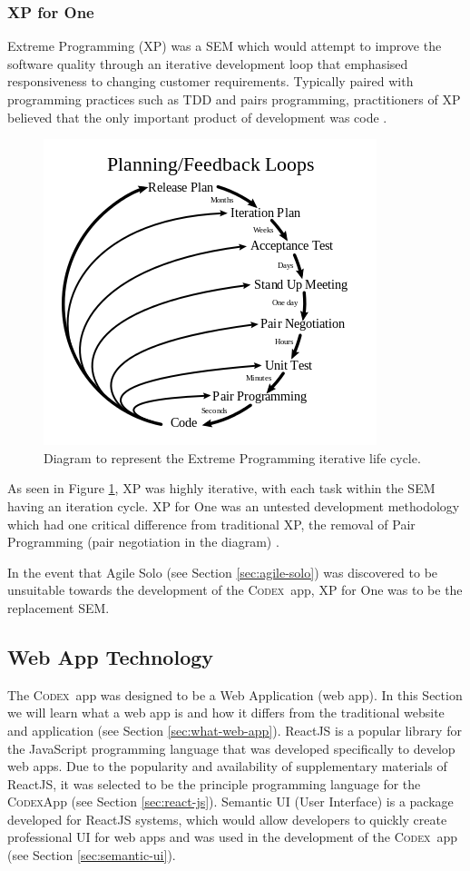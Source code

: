 \documentclass[final]{cmpreport}
\newcommand{\Codex}{\textsc{Codex}}
\begin{document}
			\subsubsection{XP for One} \label{sec:xp-for-one}
			Extreme Programming (XP) was a SEM which would attempt to improve the software quality through an iterative development loop that emphasised responsiveness to changing customer requirements. Typically paired with programming practices such as TDD and pairs programming, practitioners of XP believed that the only important product of development was code \citep{XP}.  
			
			\begin{figure}[H]
				\centering
				\includegraphics[width=0.6\linewidth]{xp.png}
				\caption[Extreme Programming Diagram]{Diagram to represent the Extreme Programming iterative life cycle.} \label{fig:xp}
			\end{figure}
			
			As seen in Figure \ref{fig:xp}, XP was highly iterative, with each task within the SEM having an iteration cycle. XP for One was an untested development methodology which had one critical difference from traditional XP, the removal of Pair Programming (pair negotiation in the diagram) \citep{SoloXP}. 
			
			In the event that Agile Solo (see Section \ref{sec:agile-solo}) was discovered to be unsuitable towards the development of the \Codex \ app, XP for One was to be the replacement SEM.
			
		\subsection{Web App Technology} \label{sec:web-app}
		The \Codex \ app was designed to be a Web Application (web app). In this Section we will learn what a web app is and how it differs from the traditional website and application (see Section \ref{sec:what-web-app}). ReactJS is a popular library for the JavaScript programming language that was developed specifically to develop web apps. Due to the popularity and availability of supplementary materials of ReactJS, it was selected to be the principle programming language for the \Codex App (see Section \ref{sec:react-js}). Semantic UI (User Interface) is a package developed for ReactJS systems, which would allow developers to quickly create professional UI for web apps and was used in the development of the \Codex \ app (see Section \ref{sec:semantic-ui}).
		
\end{document}
